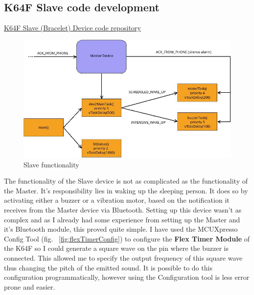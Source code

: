 \documentclass[12pt,a4paper]{article}
\begin{document}
   \subsection{K64F Slave code development}
   \href{https://github.com/zedd-1983/project_dev2/tree/Bluetooth}{K64F Slave (Bracelet) Device code repository}\\
   
   
   \begin{figure}[h]
    \centering
    \includegraphics[width=\textwidth]{dev2_functionality.jpg}
    \caption{Slave functionality}
    \label{fig:dev2Func}
   \end{figure}
   
   The functionality of the Slave device is not as complicated as the functionality of the Master. It's responsibility lies in waking up the sleeping person. It does so by activating either a buzzer or a vibration motor, based on the notification it receives from the Master device via Bluetooth. 
   Setting up this device wasn't as complex and as I already had some experience from setting up the Master and it's Bluetooth module, this proved quite simple. I have used the MCUXpresso Config Tool (fig. ~\ref{fig:flexTimerConfig}) to configure the {\bfseries Flex Timer Module} of the K64F so I could generate a square wave on the pin where the buzzer is connected. This allowed me to specify the output frequency of this square wave thus changing the pitch of the emitted sound. It is possible to do this configuration programmatically, however using the Configuration tool is less error prone and easier.
   
\end{document}
